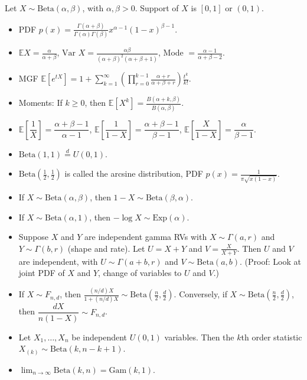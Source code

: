 \documentclass[twoside]{article}
\newcommand{\dis}{\displaystyle}
\newcommand\bbE{\mathbb{E}}
\newcommand\goesto{\rightarrow}
\newcommand\var{\text{Var }}
\begin{document}
Let $X \sim \text{Beta}(\alpha, \beta)$, with $\alpha, \beta > 0$. Support of $X$ is $[0,1]$ or $(0,1)$.
\begin{itemize}
\item PDF $p(x) = \displaystyle\frac{\Gamma (\alpha + \beta)}{\Gamma (\alpha) \Gamma (\beta)} x^{\alpha-1} (1-x)^{\beta-1}$.

\item $\bbE X = \displaystyle\frac{\alpha}{\alpha + \beta}$, $\var X = \displaystyle\frac{\alpha \beta}{(\alpha + \beta)^2 (\alpha + \beta + 1)}$, Mode $= \frac{\alpha - 1}{\alpha + \beta - 2}$.

\item MGF $\bbE [e^{tX}] = 1 + \displaystyle\sum_{k=1}^\infty \left( \prod_{r=0}^{k-1} \frac{\alpha + r}{\alpha + \beta + r} \right) \frac{t^k}{k!}$.

\item Moments: If $k \geq 0$, then $\bbE [X^k] = \displaystyle\frac{B(\alpha + k, \beta)}{B(\alpha, \beta)}$.

\item $\bbE \left[ \dfrac{1}{X} \right] = \dfrac{\alpha + \beta - 1}{\alpha - 1}$, $\bbE \left[ \dfrac{1}{1-X} \right] = \dfrac{\alpha + \beta - 1}{\beta - 1}$, $\bbE \left[ \dfrac{X}{1-X} \right] = \dfrac{\alpha}{\beta - 1}$.

\item $\text{Beta}(1,1) \stackrel{d}{=} U(0,1)$.

\item $\text{Beta}\left(\frac{1}{2}, \frac{1}{2} \right)$ is called the arcsine distribution, PDF $p(x) = \displaystyle\frac{1}{\pi \sqrt{x(1-x)}}$.

\item If $X \sim \text{Beta}(\alpha, \beta)$, then $1-X \sim \text{Beta}(\beta, \alpha)$.

\item If $X \sim \text{Beta}(\alpha, 1)$, then $- \log X \sim \text{Exp}(\alpha)$.

\item Suppose $X$ and $Y$ are independent gamma RVs with $X \sim \Gamma(a, r)$ and $Y \sim \Gamma(b, r)$ (shape and rate). Let $U = X+Y$ and $V = \displaystyle\frac{X}{X+Y}$. Then $U$ and $V$ are independent, with $U \sim \Gamma(a+b, r)$ and $V \sim \text{Beta}(a, b)$. (Proof: Look at joint PDF of $X$ and $Y$, change of variables to $U$ and $V$.)

\item If $X \sim F_{n, d}$, then $\displaystyle\frac{(n/d)X}{1 + (n/d)X} \sim \text{Beta}\left( \frac{n}{2}, \frac{d}{2} \right)$. Conversely, if $X \sim \text{Beta}\left( \frac{n}{2}, \frac{d}{2} \right)$, then $\dfrac{dX}{n(1-X)} \sim F_{n,d}$.

\item Let $X_1, \dots, X_n$ be independent $U(0,1)$ variables. Then the $k$th order statistic $X_{(k)} \sim \text{Beta}(k, n-k+1)$.

\item $\dis\lim_{n \goesto \infty} \text{Beta}(k, n) = \text{Gam}(k, 1)$.

\end{itemize}
\end{document}
